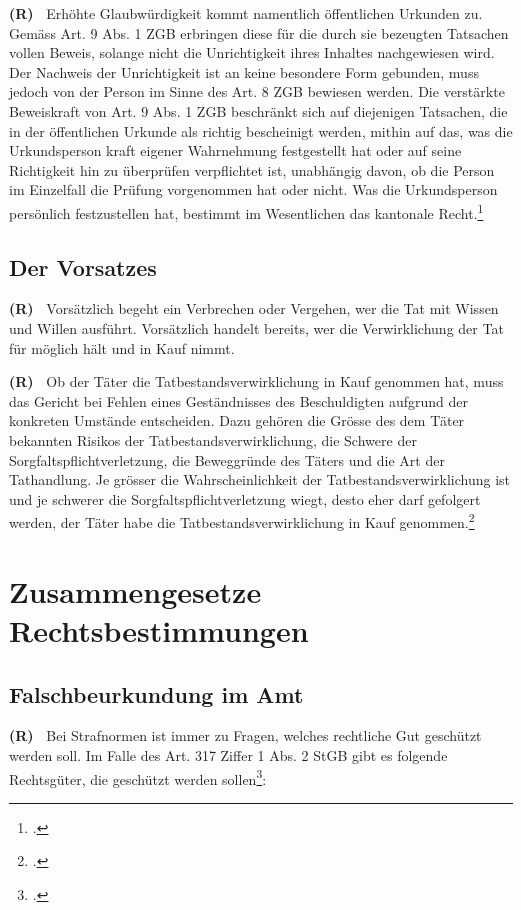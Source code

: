 \documentclass[paper=a4,fontsize=12pt, oneside, numbers=noenddot]{scrbook}
\newcounter{rz}
\newcommand{\Rz}{
	\addtocounter{rz}{1}\textbf{(R\arabic{rz})~}
}
\begin{document}
\Rz Erhöhte Glaubwürdigkeit kommt namentlich öffentlichen Urkunden zu. Gemäss Art. 9 Abs. 1 ZGB erbringen diese für die durch sie bezeugten Tatsachen vollen Beweis, solange nicht die Unrichtigkeit ihres Inhaltes nachgewiesen wird. Der Nachweis der Unrichtigkeit ist an keine besondere Form gebunden, muss jedoch von der Person im Sinne des Art. 8 ZGB bewiesen werden. Die verstärkte Beweiskraft von Art. 9 Abs. 1 ZGB beschränkt sich auf diejenigen Tatsachen, die in der öffentlichen Urkunde als richtig bescheinigt werden, mithin auf das, was die Urkundsperson kraft eigener Wahrnehmung festgestellt hat oder auf seine Richtigkeit hin zu überprüfen verpflichtet ist, unabhängig davon, ob die Person im Einzelfall die Prüfung vorgenommen hat oder nicht. Was die Urkundsperson persönlich festzustellen hat, bestimmt im Wesentlichen das kantonale Recht.\footcite{BGE113IV77}


\subsection{Der Vorsatzes}
\Rz Vorsätzlich begeht ein Verbrechen oder Vergehen, wer die Tat mit Wissen und Willen ausführt. Vorsätzlich handelt bereits, wer die Verwirklichung der Tat für möglich hält und in Kauf nimmt.

\Rz Ob der Täter die Tatbestandsverwirklichung in Kauf genommen hat, muss das Gericht bei Fehlen eines Geständnisses des Beschuldigten aufgrund der konkreten Umstände entscheiden. Dazu gehören die Grösse des dem Täter bekannten Risikos der Tatbestandsverwirklichung, die Schwere der Sorgfaltspflichtverletzung, die Beweggründe des Täters und die Art der Tathandlung. Je grösser die Wahrscheinlichkeit der Tatbestandsverwirklichung ist und je schwerer die Sorgfaltspflichtverletzung wiegt, desto eher darf gefolgert werden, der Täter habe die Tatbestandsverwirklichung in Kauf genommen.\footcite[Erw. 2.2.1.1 d) - (Seite 67)]{KGE46018365}

\section{Zusammengesetze Rechtsbestimmungen}

\subsection{Falschbeurkundung im Amt}
\Rz Bei Strafnormen ist immer zu Fragen, welches rechtliche Gut geschützt werden soll. Im Falle des Art. 317 Ziffer 1 Abs. 2 StGB gibt es folgende Rechtsgüter, die geschützt werden sollen\footcite[Art. 317, Rz. 1]{2020:Wohlers:StGBHandkommentar}:
\end{document}
